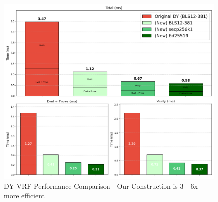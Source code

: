 \begin{figure}[!htb]
    \centering
    \includegraphics[width=0.75\linewidth]{figures/chap4_dy_comparisons.png}
        \caption[Our DY VRF Construction is 3 - 6x more efficient]{DY VRF Performance Comparison - Our Construction is 3 - 6x more efficient}
    \label{fig:chap4_public_vrf}
\end{figure}

